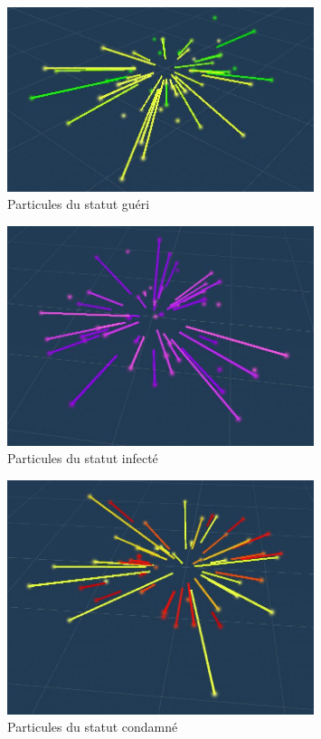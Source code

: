 \documentclass{article}
\begin{document}
\begin{figure}[H]
\centering
\includegraphics[width=0.8\textwidth]{cc/particles_healed.JPG}
\caption{Particules du statut guéri}
\label{Particules du status guéris}
\end{figure}




\begin{figure}[H]
\centering
\includegraphics[width=0.8\textwidth]{cc/particles_infected.JPG}
\caption{Particules du statut infecté}
\label{Particules du status infécté}
\end{figure}




\begin{figure}[H]
\centering
\includegraphics[width=0.8\textwidth]{cc/particles_revenge.JPG}
\caption{Particules du statut condamné}
\label{Particules du status condamné}
\end{figure}
\end{document}
